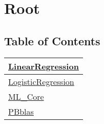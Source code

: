 \chapter*{Root}
\hypertarget{ecldoc:toc:root}{}


\section*{Table of Contents}
{\renewcommand{\arraystretch}{1.5}
\begin{longtable}{|p{\textwidth}|}
\hline
\hyperlink{ecldoc:toc:LinearRegression}{LinearRegression} \\
\hline
\hyperlink{ecldoc:toc:LogisticRegression}{LogisticRegression} \\
\hline
\hyperlink{ecldoc:toc:ML_Core}{ML\_Core} \\
\hline
\hyperlink{ecldoc:toc:PBblas}{PBblas} \\
\hline
\end{longtable}
}





